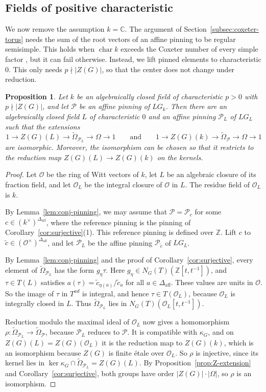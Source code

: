 \documentclass[psamsfonts]{amsart}
\newtheorem{prop}[thm]{Proposition}
\theoremstyle{definition}
\theoremstyle{remark}
\numberwithin{equation}{section}
\newcommand{\Z}{\mathbb{Z}}   %
\newcommand{\ra}{\rightarrow}
\newcommand{\tOm}{\widetilde{\Omega}}
\DeclareMathOperator{\aff}{aff}
\DeclareMathOperator{\chara}{char}
\newcommand\cO{\mathcal{O}}
\newcommand\cP{\mathcal{P}}
\newcommand{\CC}{\mathbb{C}}
\numberwithin{equation}{section}
\newcommand{\Om}{\Omega}
\newcommand{\Daff}{\Delta_{\aff}}
\theoremstyle{plain}
\begin{document}
\subsection{Fields of positive characteristic}\label{subsec:char-p}
We now remove the assumption $k=\CC$. The argument of Section~\ref{subsec:coxeter-torus} needs the sum of the root vectors of an affine pinning to be regular semisimple. This holds when $\chara k$ exceeds the Coxeter number of every simple factor \cite[Remark~3.20]{DLYZ}, but it can fail otherwise. Instead, we lift pinned elements to characteristic $0$. This only needs $p\nmid|Z(G)|$, so that the center does not change under reduction.

\begin{prop}\label{prop:reduction}
Let $k$ be an algebraically closed field of characteristic $p>0$ with $p\nmid|Z(G)|$, and let $\cP$ be an affine pinning of $LG_k$. Then there are an algebraically closed field $L$ of characteristic $0$ and an affine pinning $\cP_L$ of $LG_L$ such that the extensions
\[
1\ra Z(G)(L)\ra\tOm_{\cP_L}\ra\Om\ra1\qquad\text{and}\qquad1\ra Z(G)(k)\ra\tOm_{\cP}\ra\Om\ra1
\]
are isomorphic. Moreover, the isomorphism can be chosen so that it restricts to the reduction map $Z(G)(L)\ra Z(G)(k)$ on the kernels.
\end{prop}

\begin{proof}
Let $\cO$ be the ring of Witt vectors of $k$, let $L$ be an algebraic closure of its fraction field, and let $\cO_L$ be the integral closure of $\cO$ in $L$. The residue field of $\cO_L$ is $k$.

By Lemma~\ref{lem:conj-pinning}, we may assume that $\cP=\cP_c$ for some $c\in(k^\times)^{\Daff}$, where the reference pinning is the pinning of Corollary~\ref{cor:surjective}(1). This reference pinning is defined over $\Z$. Lift $c$ to $\tilde c\in(\cO^\times)^{\Daff}$, and let $\cP_L$ be the affine pinning $\cP_{\tilde c}$ of $LG_L$.

By Lemma~\ref{lem:conj-pinning} and the proof of Corollary~\ref{cor:surjective}, every element of $\tOm_{\cP_L}$ has the form $g_\eta\tau$. Here $g_\eta\in N_G(T)(\Z[t,t^{-1}])$, and $\tau\in T(L)$ satisfies $a(\tau)=\tilde c_{\eta(a)}/\tilde c_a$ for all $a\in\Daff$. These values are units in $\cO$. So the image of $\tau$ in $T^{ad}$ is integral, and hence $\tau\in T(\cO_L)$, because $\cO_L$ is integrally closed in $L$. Thus $\tOm_{\cP_L}$ lies in $N_G(T)(\cO_L[t,t^{-1}])$.

Reduction modulo the maximal ideal of $\cO_L$ now gives a homomorphism $\rho\colon\tOm_{\cP_L}\ra\tOm_{\cP}$, because $\cP_L$ reduces to $\cP$. It is compatible with $\kappa_G$, and on $Z(G)(L)=Z(G)(\cO_L)$ it is the reduction map to $Z(G)(k)$, which is an isomorphism because $Z(G)$ is finite étale over $\cO_L$. So $\rho$ is injective, since its kernel lies in $\ker\kappa_G\cap\tOm_{\cP_L}=Z(G)(L)$. By Proposition~\ref{prop:Z-extension} and Corollary~\ref{cor:surjective}, both groups have order $|Z(G)|\cdot|\Om|$, so $\rho$ is an isomorphism.
\end{proof}
\end{document}
